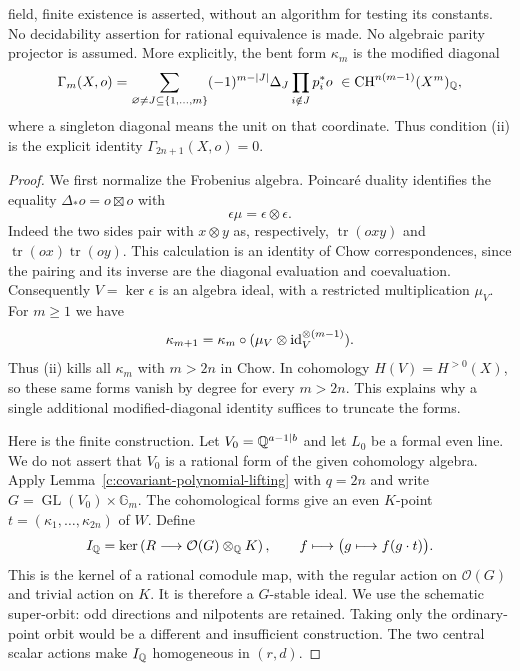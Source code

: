 \begin{theorem}
field, finite existence is asserted, without an algorithm for
testing its constants.  No decidability assertion for rational
equivalence is made.  No algebraic parity projector is assumed.
More explicitly, the bent form $\kappa_m$ is the modified diagonal
\begin{equation}
 \Gamma_m(X,o)=
 \sum_{\varnothing\ne J\subseteq\{1,\ldots,m\}}
       (-1)^{m-|J|}\Delta_J\prod_{i\notin J}p_i^*o
       \ \in\operatorname{CH}^{n(m-1)}(X^m)_\mathbb Q,
 \label{eq:c-explicit-higher-modified-diagonal}
\end{equation}
where a singleton diagonal means the unit on that coordinate.
Thus condition (ii) is the explicit identity
$\Gamma_{2n+1}(X,o)=0$.
\end{theorem}

\begin{proof}
We first normalize the Frobenius algebra.  Poincar\'e duality
identifies the equality $\Delta_*o=o\boxtimes o$ with
\[
 \epsilon\mu=\epsilon\otimes\epsilon.
\]
Indeed the two sides pair with $x\otimes y$ as, respectively,
$\operatorname{tr}(oxy)$ and
$\operatorname{tr}(ox)\operatorname{tr}(oy)$.  This calculation
is an identity of Chow correspondences, since the pairing and
its inverse are the diagonal evaluation and coevaluation.
Consequently $V=\ker\epsilon$ is an algebra ideal, with a
restricted multiplication $\mu_V$.  For $m\geq1$ we have
\begin{equation}
 \kappa_{m+1}
   =\kappa_m\circ(\mu_V\otimes\operatorname{id}_V^{\otimes(m-1)}).
 \label{eq:c-high-form-recursion}
\end{equation}
Thus (ii) kills all $\kappa_m$ with $m>2n$ in Chow.  In
cohomology $H(V)=H^{>0}(X)$, so these same forms vanish by
degree for every $m>2n$.  This explains why a single additional
modified-diagonal identity suffices to truncate the forms.

Here is the finite construction.  Let $V_0=\mathbb Q^{a-1|b}$ and let
$L_0$ be a formal even line.  We do not assert that $V_0$ is a
rational form of the given cohomology algebra.  Apply
Lemma~\ref{c:covariant-polynomial-lifting} with $q=2n$ and write
$G=\operatorname{GL}(V_0)\times\mathbb G_m$.
The cohomological forms give an even $K$-point
$t=(\kappa_1,\ldots,\kappa_{2n})$ of $W$.  Define
\begin{equation}
 I_\mathbb Q=\ker\left(R\longrightarrow\mathcal O(G)\otimes_\mathbb Q K\right),
 \qquad f\longmapsto\bigl(g\longmapsto f(g\cdot t)\bigr).
 \label{eq:c-pure-form-orbit}
\end{equation}
This is the kernel of a rational comodule map, with the regular
action on $\mathcal O(G)$ and trivial action on $K$.  It is
therefore a $G$-stable ideal.  We use the schematic super-orbit:
odd directions and nilpotents are retained.  Taking only the
ordinary-point orbit would be a different and insufficient
construction.  The two central scalar actions make $I_\mathbb Q$
homogeneous in $(r,d)$.


\end{proof}
